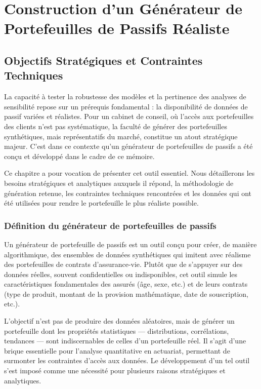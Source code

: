 \chapter{Construction d'un Générateur de Portefeuilles de Passifs Réaliste}

\section{Objectifs Stratégiques et Contraintes Techniques}
La capacité à tester la robustesse des modèles et la pertinence des analyses de sensibilité repose sur un prérequis fondamental : la disponibilité de données de passif variées et réalistes. Pour un cabinet de conseil, où l'accès aux portefeuilles des clients n'est pas systématique, la faculté de générer des portefeuilles synthétiques, mais représentatifs du marché, constitue un atout stratégique majeur. C'est dans ce contexte qu'un générateur de portefeuilles de passifs a été conçu et développé dans le cadre de ce mémoire.

Ce chapitre a pour vocation de présenter cet outil essentiel. Nous détaillerons les besoins stratégiques et analytiques auxquels il répond, la méthodologie de génération retenue, les contraintes techniques rencontrées et les données qui ont été utilisées pour rendre le portefeuille le plus réaliste possible.

 
\subsection{Définition du générateur de portefeuilles de passifs}
Un générateur de portefeuille de passifs est un outil conçu pour créer, de manière algorithmique, des ensembles de données synthétiques qui imitent avec réalisme des portefeuilles de contrats d'assurance-vie. Plutôt que de s'appuyer sur des données réelles, souvent confidentielles ou indisponibles, cet outil simule les caractéristiques fondamentales des assurés (âge, sexe, etc.) et de leurs contrats (type de produit, montant de la provision mathématique, date de souscription, etc.).

L'objectif n'est pas de produire des données aléatoires, mais de générer un portefeuille dont les propriétés statistiques — distributions, corrélations, tendances — sont indiscernables de celles d'un portefeuille réel. Il s'agit d'une brique essentielle pour l'analyse quantitative en actuariat, permettant de surmonter les contraintes d'accès aux données. Le développement d'un tel outil s'est imposé comme une nécessité pour plusieurs raisons stratégiques et analytiques.


